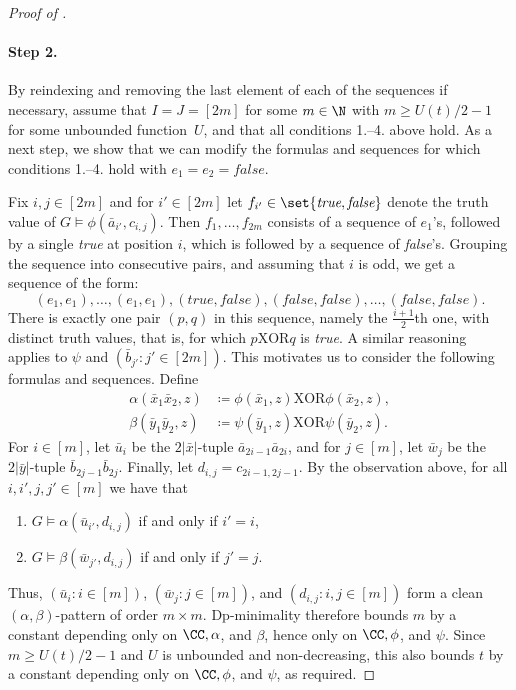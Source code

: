 \begin{proof}[Proof of ]
\paragraph{Step 2.}
By reindexing and removing the last element of each of the sequences if necessary,
assume that $I=J=[2m]$ for some $m\in\N$ with $m\ge U(t)/2-1$ for some unbounded function~$U$, and that all conditions 1.--4. above hold.
As a next step, we show that we can modify the formulas and sequences for which conditions 1.--4. hold with $e_1=e_2=\textit{false}$.

Fix $i,j\in [2m]$
and for $i'\in [2m]$ let $f_{i'}\in\set{\textit{true}, \textit{false}}$ denote the truth value
of $G\models \phi(\bar a_{i'},c_{i,j})$.
Then $f_1,\ldots,f_{2m}$
consists of a sequence of $e_1$'s, followed by a single \emph{true} at position $i$, which is followed by a sequence of \emph{false}'s.
Grouping the sequence into consecutive pairs,
and assuming that $i$ is odd,
we get a sequence of the form:
$$(e_1,e_1),\ldots,(e_1,e_1),(\textit{true},\textit{false}),(\textit{false},\textit{false}),\ldots, (\textit{false},\textit{false}).$$
There is exactly one pair $(p,q)$ in this sequence, namely the $\frac{i+1}2$th one, with distinct truth values,
that is, for which $p\mathbin{\mathrm{XOR}}q$ is \emph{true}. A similar reasoning applies to $\psi$ and $(\bar b_{j'}:j'\in [2m])$.
This motivates us to consider the following formulas and sequences. Define
\begin{align*}
\alpha(\bar x_1\bar x_2,z)&\coloneqq \phi(\bar x_1,z)\mathbin{\mathrm{XOR}} \phi(\bar x_2,z),\\
\beta(\bar y_1\bar y_2,z)&\coloneqq \psi(\bar y_1,z)\mathbin{\mathrm{XOR}} \psi(\bar y_2,z).
\end{align*}
For $i\in[m]$,
let $\bar u_i$ be the $2|\bar x|$-tuple
 $\bar a_{2i-1}\bar a_{2i}$,
 and for $j\in[m]$, let $\bar w_j$
 be the $2|\bar y|$-tuple $\bar b_{2j-1}\bar b_{2j}$.
 Finally, let $d_{i,j}=c_{2i-1,2j-1}$.
 By the observation above,
 for all $i,i',j,j'\in[m]$ we have that
 \begin{enumerate}[label=(\textit{\alph*}),ref=(\textit{\alph*})]
    \item\label{item:pattern-alpha} $G\models \alpha(\bar u_{i'},d_{i,j})$ if and only if $i'=i$,
    \item\label{item:pattern-beta} $G\models \beta(\bar w_{j'},d_{i,j})$ if and only if $j'=j$.
 \end{enumerate}

Thus, $(\bar u_i:i\in[m])$, $(\bar w_j:j\in[m])$, and $(d_{i,j}:i,j\in[m])$ form a clean $(\alpha,\beta)$-pattern of order $m\times m$.
Dp-minimality therefore bounds $m$ by a constant depending only on $\CC,\alpha$, and $\beta$, hence only on $\CC,\phi$, and $\psi$.
Since $m\ge U(t)/2-1$ and $U$ is unbounded and non-decreasing, this also bounds $t$ by a constant depending only on $\CC,\phi$, and $\psi$, as required.
\end{proof}
